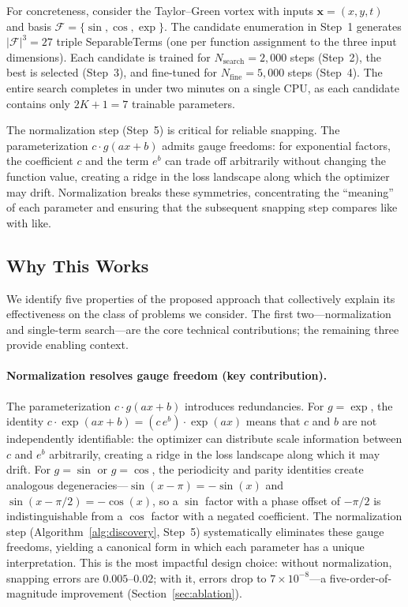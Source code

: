 For concreteness, consider the Taylor--Green vortex with inputs
$\mathbf{x} = (x, y, t)$ and basis $\mathcal{F} = \{\sin, \cos, \exp\}$.
The candidate enumeration in Step~1 generates $|\mathcal{F}|^3 = 27$ triple
SeparableTerms (one per function assignment to the three input dimensions).
Each candidate is trained for $N_{\mathrm{search}} = 2{,}000$ steps (Step~2),
the best is selected (Step~3), and fine-tuned for $N_{\mathrm{fine}} = 5{,}000$
steps (Step~4).  The entire search completes in under two minutes on a single
CPU, as each candidate contains only $2K + 1 = 7$ trainable parameters.

The normalization step (Step~5) is critical for reliable snapping.
The parameterization $c \cdot g(ax + b)$ admits gauge freedoms:
for exponential factors, the coefficient $c$ and the term $e^b$ can trade off
arbitrarily without changing the function value, creating a ridge in the loss
landscape along which the optimizer may drift.  Normalization breaks these
symmetries, concentrating the ``meaning'' of each parameter and ensuring that
the subsequent snapping step compares like with like.

\subsection{Why This Works}
\label{sec:why}

We identify five properties of the proposed approach that collectively
explain its effectiveness on the class of problems we consider.
The first two---normalization and single-term search---are the core
technical contributions; the remaining three provide enabling context.

\paragraph{Normalization resolves gauge freedom (key contribution).}
The parameterization $c \cdot g(ax + b)$ introduces redundancies.
For $g = \exp$, the identity $c \cdot \exp(ax + b) = (c\,e^{b}) \cdot \exp(ax)$
means that $c$ and $b$ are not independently identifiable: the optimizer
can distribute scale information between $c$ and $e^{b}$ arbitrarily,
creating a ridge in the loss landscape along which it may drift.
For $g = \sin$ or $g = \cos$, the periodicity and parity identities
create analogous degeneracies---$\sin(x - \pi) = -\sin(x)$ and
$\sin(x - \pi/2) = -\cos(x)$, so a $\sin$ factor with a phase offset
of $-\pi/2$ is indistinguishable from a $\cos$ factor with a negated
coefficient.  The normalization step
(Algorithm~\ref{alg:discovery}, Step~5) systematically eliminates
these gauge freedoms, yielding a canonical form in which each parameter
has a unique interpretation.  This is the most impactful design choice:
without normalization, snapping errors are $0.005$--$0.02$; with it,
errors drop to $7 \times 10^{-8}$---a five-order-of-magnitude improvement
(Section~\ref{sec:ablation}).

